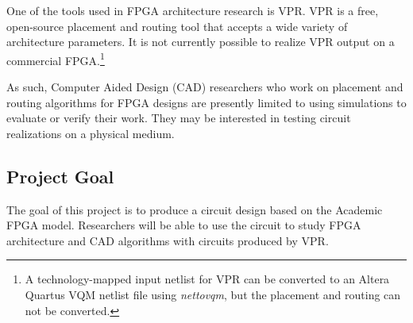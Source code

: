 One of the tools used in FPGA architecture research is VPR\cite{vpr}.
VPR is a free, open-source placement and routing tool that accepts a wide variety of architecture parameters. \citationneeded
It is not currently possible to realize VPR output on a commercial FPGA.\footnote{A technology-mapped input netlist for VPR can be converted to an Altera Quartus VQM netlist file using \emph{nettovqm}\cite{nettovqm}, but the placement and routing can not be converted.}

As such, Computer Aided Design (CAD) researchers who work on placement and routing algorithms for FPGA designs are presently limited to using simulations to evaluate or verify their work.
They may be interested in testing circuit realizations on a physical medium.



\subsection{Project Goal}

% 

The goal of this project is to produce a circuit design based on the Academic FPGA model.
Researchers will be able to use the circuit to study FPGA architecture and CAD algorithms with circuits produced by VPR.



